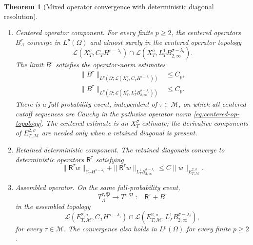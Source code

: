 \documentclass[11pt,reqno]{amsart}
\numberwithin{equation}{section}
\theoremstyle{plain}
\newtheorem{theorem}{Theorem}[section]
\theoremstyle{definition}
\newcommand{\cL}{\mathcal L}
\newcommand{\cM}{\mathcal M}
\newcommand{\Ret}{\mathsf R}
\begin{document}
\begin{theorem}[Mixed operator convergence with deterministic diagonal resolution]
\begin{enumerate}[label=(\roman*),leftmargin=2.4em]
\item \textup{Centered operator component.}  For every finite \(p\ge2\), the centered operators \(B^\tau_\Lambda\) converge in \(L^p(\Omega)\) and almost surely in the centered operator topology
\begin{equation}\label{eq:centered-op-topology}
        \cL(X_T^\sigma,C_TH^{s-\lambda_i})
        \cap
        \cL(X_T^\sigma,L_T^1B^{\sigma-\lambda_i}_{2,\infty}).
\end{equation}
The limit \(B^\tau\) satisfies the operator-norm estimates
\begin{align}
        \|B^\tau\|_{L^p(\Omega;\cL(X_T^\sigma,C_TH^{s-\lambda_i}))}
        &\le C_p,\label{eq:centered-H}\\
        \|B^\tau\|_{L^p(\Omega;\cL(X_T^\sigma,L_T^1B^{\sigma-\lambda_i}_{2,\infty}))}
        &\le C_p.\label{eq:centered-B}
\end{align}
There is a full-probability event, independent of \(\tau\in\cM\), on which all centered cutoff sequences are Cauchy in the pathwise operator norm \eqref{eq:centered-op-topology}.  The centered estimate is an \(X_T^\sigma\)-estimate; the derivative components of \(E_{T,\cM}^{2,\sigma}\) are needed only when a retained diagonal is present.

\item \textup{Retained deterministic component.}  The retained diagonals converge to deterministic operators \(\Ret^\tau\) satisfying
\begin{equation}\label{eq:retained-main-bound}
        \|\Ret^\tau w\|_{C_TH^{s-\lambda_i}}
        +\|\Ret^\tau w\|_{L_T^1B^{\sigma-\lambda_i}_{2,\infty}}
        \le C\|w\|_{E_{T,\cM}^{2,\sigma}} .
\end{equation}

\item \textup{Assembled operator.}  On the same full-probability event,
\begin{equation}\label{eq:assembled-limit}
        T_{\Lambda}^{\tau,\mathfrak P}
        \longrightarrow
        T^{\tau,\mathfrak P}:=\Ret^\tau+B^\tau
\end{equation}
in the assembled topology
\begin{equation}\label{eq:assembled-op-topology}
        \cL(E_{T,\cM}^{2,\sigma},C_TH^{s-\lambda_i})
        \cap
        \cL(E_{T,\cM}^{2,\sigma},L_T^1B^{\sigma-\lambda_i}_{2,\infty}),
\end{equation}
for every \(\tau\in\cM\).  The convergence also holds in \(L^p(\Omega)\) for every finite \(p\ge2\).
\end{enumerate}
\end{theorem}
\end{document}
